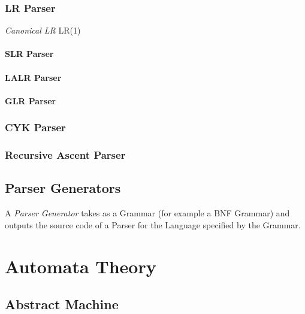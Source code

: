 \subsubsection{LR Parser}

\emph{Canonical LR} LR(1)

\paragraph{SLR Parser}

\paragraph{LALR Parser}

\paragraph{GLR Parser}

\subsubsection{CYK Parser}

\subsubsection{Recursive Ascent Parser}



\subsection{Parser Generators}\label{sec:parser_generator}

A \emph{Parser Generator} takes as a Grammar (for example a BNF
Grammar) and outputs the source code of a Parser for the Language
specified by the Grammar.



\section{Automata Theory}\label{sec:automata_theory}

\subsection{Abstract Machine} \label{sec:abstract_machine}

